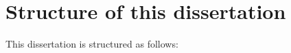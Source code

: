 
    

    


\section{Structure of this dissertation}\label{sec:intro-structure}
This dissertation is structured as follows:

